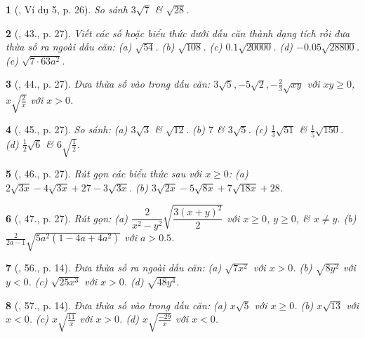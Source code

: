 \documentclass{article}
\newtheorem{baitoan}{}
\begin{document}
\begin{baitoan}[\cite{SGK_Toan_9_tap_1}, Ví dụ 5, p. 26]
	So sánh $3\sqrt{7}$ \& $\sqrt{28}$.
\end{baitoan}

\begin{baitoan}[\cite{SGK_Toan_9_tap_1}, 43., p. 27]
	Viết các số hoặc biểu thức dưới dấu căn thành dạng tích rồi đưa thừa số ra ngoài dấu căn: (a) $\sqrt{54}$. (b) $\sqrt{108}$. (c) $0.1\sqrt{20000}$. (d) $-0.05\sqrt{28800}$. (e) $\sqrt{7\cdot63a^2}$.
\end{baitoan}

\begin{baitoan}[\cite{SGK_Toan_9_tap_1}, 44., p. 27]
	Đưa thừa số vào trong dấu căn: $3\sqrt{5},-5\sqrt{2},-\frac{2}{3}\sqrt{xy}$ với $xy\ge0$, $x\sqrt{\frac{2}{x}}$ với $x > 0$.
\end{baitoan}

\begin{baitoan}[\cite{SGK_Toan_9_tap_1}, 45., p. 27]
	So sánh: (a) $3\sqrt{3}$ \& $\sqrt{12}$. (b) $7$ \& $3\sqrt{5}$. (c) $\frac{1}{3}\sqrt{51}$ \& $\frac{1}{5}\sqrt{150}$. (d) $\frac{1}{2}\sqrt{6}$ \& $6\sqrt{\frac{1}{2}}$.	
\end{baitoan}

\begin{baitoan}[\cite{SGK_Toan_9_tap_1}, 46., p. 27]
	Rút gọn các biểu thức sau với $x\ge0$: (a) $2\sqrt{3x} - 4\sqrt{3x} + 27 - 3\sqrt{3x}$. (b) $3\sqrt{2x} - 5\sqrt{8x} + 7\sqrt{18x} + 28$.
\end{baitoan}

\begin{baitoan}[\cite{SGK_Toan_9_tap_1}, 47., p. 27]
	Rút gọn: (a) $\dfrac{2}{x^2 - y^2}\sqrt{\dfrac{3(x + y)^2}{2}}$ với $x\ge0$, $y\ge0$, \& $x\ne y$. (b) $\frac{2}{2a - 1}\sqrt{5a^2(1 - 4a + 4a^2)}$ với $a > 0.5$.
\end{baitoan}

\begin{baitoan}[\cite{SBT_Toan_9_tap_1}, 56., p. 14]
	Đưa thừa số ra ngoài dấu căn: (a) $\sqrt{7x^2}$ với $x > 0$. (b) $\sqrt{8y^2}$ với $y < 0$. (c) $\sqrt{25x^3}$ với $x > 0$. (d) $\sqrt{48y^4}$.
\end{baitoan}

\begin{baitoan}[\cite{SBT_Toan_9_tap_1}, 57., p. 14]
	Đưa thừa số vào trong dấu căn: (a) $x\sqrt{5}$ với $x\ge0$. (b) $x\sqrt{13}$ với $x < 0$. (c) $x\sqrt{\frac{11}{x}}$ với $x > 0$. (d) $x\sqrt{\frac{-29}{x}}$  với $x < 0$.
\end{baitoan}
\end{document}
